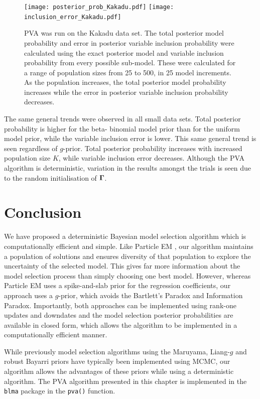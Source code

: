\begin{figure}[ht!]
	\texttt{[image: posterior\_prob\_Kakadu.pdf]}
	\texttt{[image: inclusion\_error\_Kakadu.pdf]}

	\caption{PVA was run on the Kakadu data set. The total posterior model probability and error in posterior 
						variable inclusion probability were calculated using the exact posterior model and variable  
						inclusion probability from every possible sub-model. These were calculated for a range of 
						population sizes from 25 to 500, in 25 model increments.
						As the population increases, the total posterior model probability increases while the error in 
						posterior variable inclusion probability decreases.}
	\label{fig:kakadu_total_posterior_mass}
\end{figure}


The same general trends were observed in all small data sets. Total posterior
probability is higher for the beta- binomial model prior than for the uniform
model prior, while the variable inclusion error is lower. This same general
trend is seen regardless of $g$-prior. Total posterior probability increases
with increased population size $K$, while variable inclusion error decreases.
Although the PVA algorithm is deterministic, variation in the results amongst
the trials is seen due to the random initialisation of ${\boldsymbol \Gamma}$.

\section{Conclusion}
\label{sec:chapter_4_conclusion}
We have proposed a deterministic Bayesian model selection algorithm which is
computationally efficient and simple. Like Particle EM \citep{Rockova2017}, our
algorithm maintains a population of solutions and ensures diversity of that
population to explore the uncertainty of the selected model. This gives far
more information about the model selection process than simply choosing one
best model. However, whereas Particle EM uses a spike-and-slab prior for the
regression coefficients, our approach uses a $g$-prior, which avoids the
Bartlett's Paradox and Information Paradox. Importantly, both approaches can be
implemented using rank-one updates and downdates and the model selection
posterior probabilities are available in closed form, which allows the
algorithm to be implemented in a computationally efficient manner.

While previously model selection algorithms using the Maruyama, Liang-$g$ and
robust Bayarri priors have typically been implemented using MCMC, our algorithm
allows the advantages of these priors while using a deterministic algorithm.
The PVA algorithm  presented in this chapter is implemented in the {\tt blma}
package in the {\tt pva()} function.
